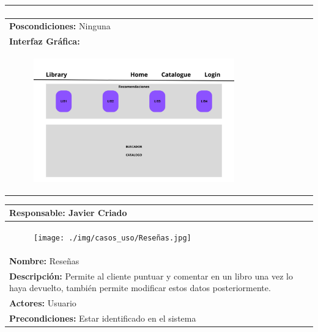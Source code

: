 \documentclass{report}
\begin{document}
\begin{center}
\begin{longtable}{|p{\linewidth}|}
\begin{enumerate}
                        []
                    \end{enumerate}\\
                    \hline
                    \textbf{Poscondiciones:} Ninguna\\
                    \hline
                    \textbf{Interfaz Gráfica:}\\
                    \begin{figure}[H]
                        \centering
                        \includegraphics[width=0.8\textwidth]{./img/grafico/recom_lib.png}
                    \end{figure}\\
                    \hline
                \end{longtable}
            \end{center}\begin{center}
                \begin{longtable}{|p{\linewidth}|}
                    \hline
                    \textbf{Responsable:} Javier Criado\\
                    \hline
                    \begin{figure}[H]
                        \centering
                        \texttt{[image: ./img/casos\_uso/Reseñas.jpg]}
                    \end{figure}\\
                    \hline
                    \textbf{Nombre:} Reseñas\\
                    \hline
                    \textbf{Descripción:} Permite al cliente puntuar y comentar en un libro una vez lo haya devuelto, también permite modificar estos datos posteriormente.\\
                    \hline
                    \textbf{Actores:} Usuario\\
                    \hline
                    \textbf{Precondiciones:} Estar identificado en el sistema\\

\end{longtable}
\end{center}
\end{document}
